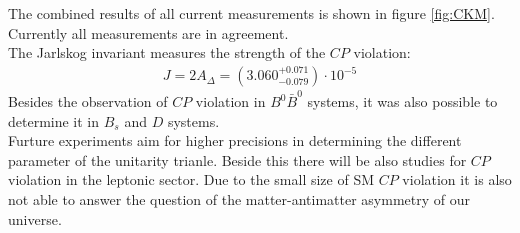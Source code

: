 The combined results of all current measurements is shown in figure \ref{fig:CKM}. Currently all measurements are in agreement. \\
The Jarlskog invariant measures the strength of the $CP$ violation:
\begin{align}
	J = 2 A_{\Delta} = (3.060^{+0.071}_{-0.079}) \cdot 10^{-5}
\end{align}
Besides the observation of $CP$ violation in $B^0\bar{B}^0$ systems, it was also possible to determine it in $B_s$ and $D$ systems.\\
Furture experiments aim for higher precisions in determining the different parameter of the unitarity trianle. Beside this there will be also studies for $CP$ violation in the leptonic sector. Due to the small size of SM $CP$ violation it is also not able to answer the question of the matter-antimatter asymmetry of our universe.
